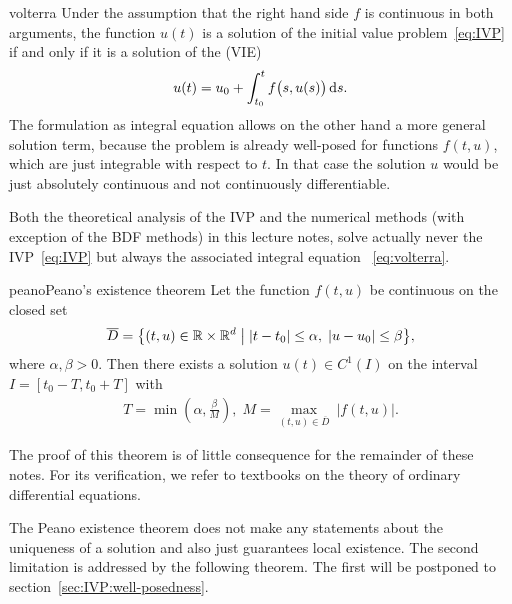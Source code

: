 \begin{Lemma}{volterra}
  Under the assumption that the right hand side $f$ is continuous in
  both arguments, the function $u(t)$ is a solution of the initial
  value problem~\eqref{eq:IVP} if and only if it is a solution of the
   (VIE) 
  \begin{gather}
    \label{eq:volterra}
    u(t) = u_0 + \int_{t_0}^t f\bigl(s,u(s)\bigr)\,\mathrm{d} s.
  \end{gather}
  The formulation as integral equation allows on the other hand a more
  general solution term, because the problem is already well-posed for
  functions $f(t,u)$, which are just integrable with respect to $t$.
  In that case the solution $u$ would be just absolutely continuous
  and not continuously differentiable.
\end{Lemma}

\begin{remark} \label{remark:volterra}
  Both the theoretical analysis of the IVP and the numerical methods
  (with exception of the BDF methods) in this lecture notes, solve
  actually never the IVP~\eqref{eq:IVP} but always the associated
  integral equation ~\eqref{eq:volterra}.
\end{remark}

\begin{Theorem*}{peano}{Peano's existence theorem}
  \label{satz:peano}
  Let the function $f(t,u)$ be continuous on the closed set
  \begin{gather*}
    \overline D =\bigl\{
    (t,u) \in \mathbb R\times\mathbb R^d \;\big|
    \;|t-t_0| \le \alpha,\;
    |u-u_0|\le\beta
    \bigr\},
  \end{gather*}
  where $\alpha,\beta>0$. Then there exists a solution
    $u(t) \in C^1(I)$
  on the interval
    $I=[t_0-T,t_0+T]$
  with
  \begin{gather*}
    T=\min\left(\alpha ,\frac{\beta}{M}\right),\;
    M=\max_{(t,u)\in \overline D} \ |f(t,u)|.
  \end{gather*}
\end{Theorem*}

The proof of this theorem is of little consequence for the remainder
of these notes.  For its verification, we refer to textbooks on the
theory of ordinary differential equations.

\begin{remark}
  The Peano existence theorem does not make any statements about the
  uniqueness of a solution and also just guarantees local existence.
  The second limitation is addressed by the following theorem. The
  first will be postponed to section~\ref{sec:IVP:well-posedness}.
\end{remark}

